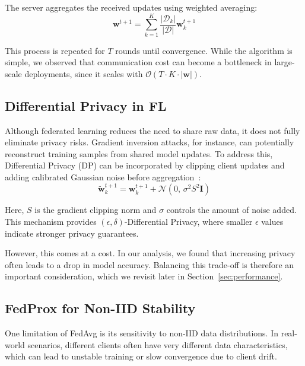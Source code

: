 \documentclass[conference]{IEEEtran}
\begin{document}
The server aggregates the received updates using weighted averaging:
\begin{equation}
    \mathbf{w}^{t+1} = \sum_{k=1}^{K} \frac{|\mathcal{D}_k|}{|\mathcal{D}|} \mathbf{w}_k^{t+1}
    \label{eq:fedavg}
\end{equation}

This process is repeated for $T$ rounds until convergence. While the algorithm is simple, we observed that communication cost can become a bottleneck in large-scale deployments, since it scales with $\mathcal{O}(T \cdot K \cdot |\mathbf{w}|)$.

\subsection{Differential Privacy in FL}

Although federated learning reduces the need to share raw data, it does not fully eliminate privacy risks. Gradient inversion attacks, for instance, can potentially reconstruct training samples from shared model updates. To address this, Differential Privacy (DP) can be incorporated by clipping client updates and adding calibrated Gaussian noise before aggregation~\cite{park2023}:
\begin{equation}
    \tilde{\mathbf{w}}_k^{t+1} = \mathbf{w}_k^{t+1} + \mathcal{N}\!\left(0,\, \sigma^2 S^2 \mathbf{I}\right)
    \label{eq:dp}
\end{equation}

Here, $S$ is the gradient clipping norm and $\sigma$ controls the amount of noise added. This mechanism provides $(\epsilon, \delta)$-Differential Privacy, where smaller $\epsilon$ values indicate stronger privacy guarantees.

However, this comes at a cost. In our analysis, we found that increasing privacy often leads to a drop in model accuracy. Balancing this trade-off is therefore an important consideration, which we revisit later in Section~\ref{sec:performance}.

\subsection{FedProx for Non-IID Stability}

One limitation of FedAvg is its sensitivity to non-IID data distributions. In real-world scenarios, different clients often have very different data characteristics, which can lead to unstable training or slow convergence due to client drift.
\end{document}
